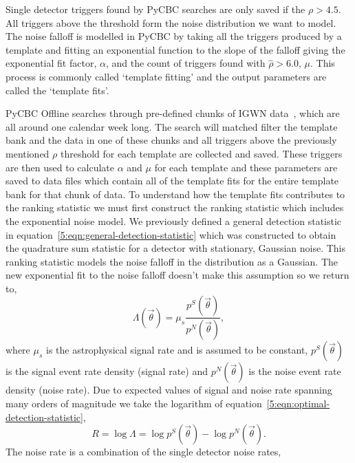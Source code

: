 Single detector triggers found by PyCBC searches are only saved if the $\rho > 4.5$. All triggers above the threshold form the noise distribution we want to model. The noise falloff is modelled in PyCBC by taking all the triggers produced by a template and fitting an exponential function to the slope of the falloff giving the exponential fit factor, $\alpha$, and the count of triggers found with $\hat{\rho} > 6.0$, $\mu$. This process is commonly called `template fitting' and the output parameters are called the `template fits'.

PyCBC Offline searches through pre-defined chunks of IGWN data~\cite{gwtc3:2023}, which are all around one calendar week long. The search will matched filter the template bank and the data in one of these chunks and all triggers above the previously mentioned $\rho$ threshold for each template are collected and saved. These triggers are then used to calculate $\alpha$ and $\mu$ for each template and these parameters are saved to data files which contain all of the template fits for the entire template bank for that chunk of data.
%
% 
To understand how the template fits contributes to the ranking statistic we must first construct the ranking statistic which includes the exponential noise model. We previously defined a general detection statistic in equation~\ref{5:eqn:general-detection-statistic} which was constructed to obtain the quadrature sum statistic for a detector with stationary, Gaussian noise. This ranking statistic models the noise falloff in the distribution as a Gaussian. The new exponential fit to the noise falloff doesn't make this assumption so we return to,
%
\begin{equation}
    \Lambda(\Vec{\theta}) = \mu_{s} \frac{p^{S}(\Vec{\theta})}{p^{N}(\Vec{\theta})} ,
    \label{5:eqn:optimal-detection-statistic}
\end{equation}
where $\mu_{s}$ is the astrophysical signal rate and is assumed to be constant, $p^{S}(\Vec{\theta})$ is the signal event rate density (signal rate) and $p^{N}(\Vec{\theta})$ is the noise event rate density (noise rate). Due to expected values of signal and noise rate spanning many orders of magnitude we take the logarithm of equation~\ref{5:eqn:optimal-detection-statistic},
%
\begin{equation}
    R = \log \Lambda = \log p^{S}(\Vec{\theta}) - \log p^{N}(\Vec{\theta}).
    \label{5:eqn:signal-minus-noise-rate}
\end{equation}
The noise rate is a combination of the single detector noise rates,
